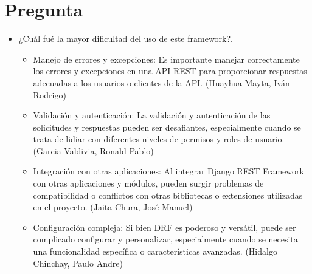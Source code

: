 \documentclass{article}
\begin{document}
    \section{Pregunta}
    \begin{itemize}
        \item ¿Cuál fué la mayor dificultad del uso de este framework?.
        \begin{itemize}
            \item Manejo de errores y excepciones: Es importante manejar correctamente los errores y excepciones en una API REST para proporcionar respuestas adecuadas a los usuarios o clientes de la API. (Huayhua Mayta, Iván Rodrigo)
            \item Validación y autenticación: La validación y autenticación de las solicitudes y respuestas pueden ser desafiantes, especialmente cuando se trata de lidiar con diferentes niveles de permisos y roles de usuario. (Garcia Valdivia, Ronald Pablo)
            \item Integración con otras aplicaciones: Al integrar Django REST Framework con otras aplicaciones y módulos, pueden surgir problemas de compatibilidad o conflictos con otras bibliotecas o extensiones utilizadas en el proyecto. (Jaita Chura, José Manuel)
            \item Configuración compleja: Si bien DRF es poderoso y versátil, puede ser complicado configurar y personalizar, especialmente cuando se necesita una funcionalidad específica o características avanzadas. (Hidalgo Chinchay, Paulo Andre)
        \end{itemize}
    \end{itemize}
    
\end{document}
